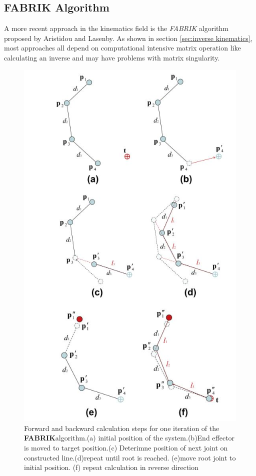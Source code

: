 \subsection{FABRIK Algorithm}
\label{sec:fabrik_algorithm}
A more recent approach in the kinematics field is the \textit{FABRIK} algorithm proposed by Aristidou and Lasenby\cite{Aristidou.2011}. As shown in section \ref{sec:inverse kinematics}, most approaches all depend on computational intensive matrix operation like calculating an inverse and may have problems with matrix singularity.\\
\begin{figure}
\includegraphics[width=\textwidth/2]{images/FabrikIteration.jpg}
\caption{Forward and backward calculation steps for one iteration of the \textbf{FABRIK}algorithm.(a) initial position of the system.(b)End effector is moved to target position.(c) Deterimne position of next joint on constructed line.(d)repeat until root is reached. (e)move root joint to initial position. (f) repeat calculation in reverse direction \cite{Aristidou.2011} }
\label{fig:Fabrik_Iteration}
\end{figure}
